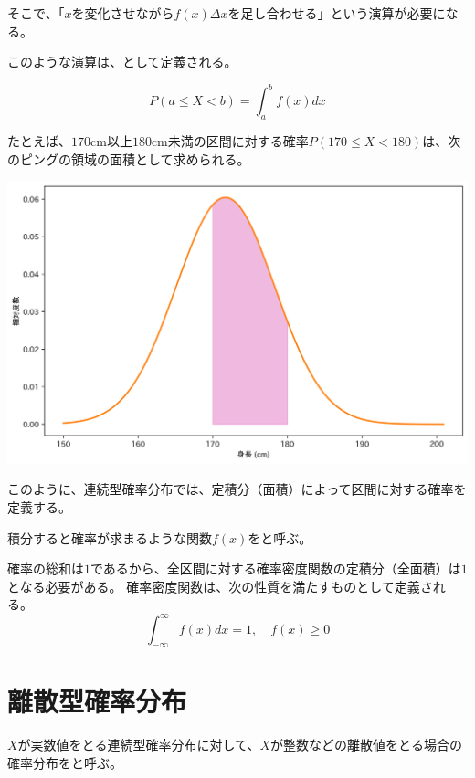 \documentclass[../../../topic_statistics]{subfiles}
\begin{document}
\br

そこで、「$x$を変化させながら$f(x)\Delta x$を足し合わせる」という演算が必要になる。

このような演算は、として定義される。

\begin{equation*}
  P(a \leq X < b) = \int_a^b f(x) dx
\end{equation*}

\br

たとえば、$170$cm以上$180$cm未満の区間に対する確率$P(170 \leq X < 180)$は、次のピングの領域の面積として求められる。

\br

\includegraphics[width=0.95\linewidth]{./python/sampling-height_probability.png}

\br

このように、連続型確率分布では、定積分（面積）によって区間に対する確率を定義する。

積分すると確率が求まるような関数$f(x)$をと呼ぶ。

\br

確率の総和は$1$であるから、全区間に対する確率密度関数の定積分（全面積）は$1$となる必要がある。
確率密度関数は、次の性質を満たすものとして定義される。
\begin{equation*}
  \int_{-\infty}^{\infty} f(x) dx = 1, \quad f(x) \geq 0
\end{equation*}

\sectionline
\section{離散型確率分布}

$X$が実数値をとる連続型確率分布に対して、$X$が整数などの離散値をとる場合の確率分布をと呼ぶ。
\end{document}
